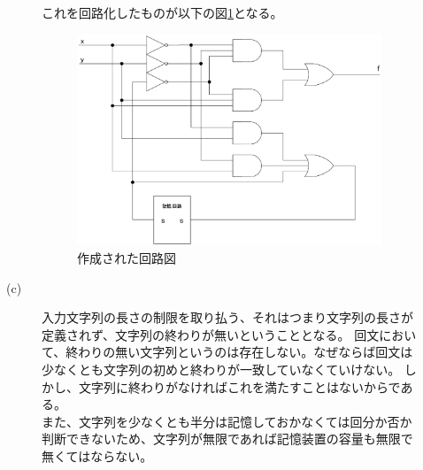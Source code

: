\documentclass{jsarticle}
\begin{document}
\begin{description}
\begin{description}
            これを回路化したものが以下の図\ref{fig7}となる。
            \begin{figure}[H]
                \centering
                \includegraphics[width=10cm]{fig_7.eps}
                \caption{作成された回路図}
                \label{fig7}
            \end{figure}

            \item[(c)]
            入力文字列の長さの制限を取り払う、それはつまり文字列の長さが定義されず、文字列の終わりが無いということとなる。
            回文において、終わりの無い文字列というのは存在しない。なぜならば回文は少なくとも文字列の初めと終わりが一致していなくていけない。
            しかし、文字列に終わりがなければこれを満たすことはないからである。
            \\
            また、文字列を少なくとも半分は記憶しておかなくては回分か否か判断できないため、文字列が無限であれば記憶装置の容量も無限で無くてはならない。

        \end{description}
    \end{description}
\end{document}
